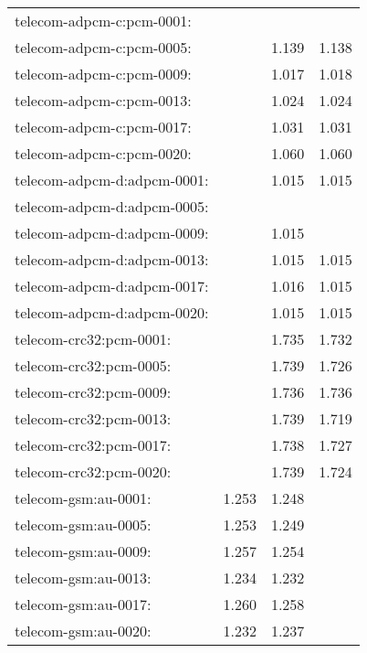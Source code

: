 \begin{longtable}{lrrr}
telecom-adpcm-c:pcm-0001: & \color{Green}{1.022} & \color{Green}{1.022} & \color{Green}{1.022} \\
telecom-adpcm-c:pcm-0005: & \color{Green}{1.140} & 1.139 & 1.138 \\
telecom-adpcm-c:pcm-0009: & \color{Green}{1.019} & 1.017 & 1.018 \\
telecom-adpcm-c:pcm-0013: & \color{Green}{1.025} & 1.024 & 1.024 \\
telecom-adpcm-c:pcm-0017: & \color{Green}{1.032} & 1.031 & 1.031 \\
telecom-adpcm-c:pcm-0020: & \color{Green}{1.061} & 1.060 & 1.060 \\
telecom-adpcm-d:adpcm-0001: & \color{Green}{1.016} & 1.015 & 1.015 \\
telecom-adpcm-d:adpcm-0005: & \color{Green}{1.016} & \color{Green}{1.016} & \color{Green}{1.016} \\
telecom-adpcm-d:adpcm-0009: & \color{Green}{1.016} & 1.015 & \color{Green}{1.016} \\
telecom-adpcm-d:adpcm-0013: & \color{Green}{1.017} & 1.015 & 1.015 \\
telecom-adpcm-d:adpcm-0017: & \color{Green}{1.017} & 1.016 & 1.015 \\
telecom-adpcm-d:adpcm-0020: & \color{Green}{1.016} & 1.015 & 1.015 \\
telecom-crc32:pcm-0001: & \color{Green}{1.736} & 1.735 & 1.732 \\
telecom-crc32:pcm-0005: & \color{Green}{1.740} & 1.739 & 1.726 \\
telecom-crc32:pcm-0009: & \color{Green}{1.737} & 1.736 & 1.736 \\
telecom-crc32:pcm-0013: & \color{Green}{1.741} & 1.739 & 1.719 \\
telecom-crc32:pcm-0017: & \color{Green}{1.740} & 1.738 & 1.727 \\
telecom-crc32:pcm-0020: & \color{Green}{1.742} & 1.739 & 1.724 \\
telecom-gsm:au-0001: & 1.253 & 1.248 & \color{Green}{1.256} \\
telecom-gsm:au-0005: & 1.253 & 1.249 & \color{Green}{1.254} \\
telecom-gsm:au-0009: & 1.257 & 1.254 & \color{Green}{1.261} \\
telecom-gsm:au-0013: & 1.234 & 1.232 & \color{Green}{1.238} \\
telecom-gsm:au-0017: & 1.260 & 1.258 & \color{Green}{1.264} \\
telecom-gsm:au-0020: & 1.232 & 1.237 & \color{Green}{1.242} \\
\end{longtable}
